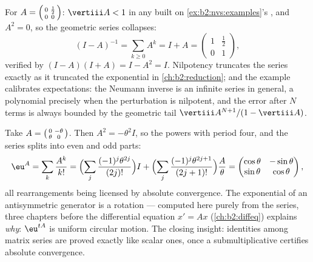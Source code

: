 \begin{example}\label{ex:b2:nvs:neumannfinite}
For $A = \begin{psmallmatrix}0 & \frac12\\ 0 &
0\end{psmallmatrix}$: $\vertiii A < 1$ in any 
built on \cref{ex:b2:nvs:examples}'s , and $A^2 = 0$, so
the geometric series collapses:
\[
(I - A)^{-1} = \sum_{k \geq 0} A^k = I + A =
\begin{pmatrix}1 & \tfrac12\\ 0 & 1\end{pmatrix},
\]
verified by $(I - A)(I + A) = I - A^2 = I$. Nilpotency
truncates the series exactly as it truncated the exponential in
\cref{ch:b2:reduction}; and the example calibrates
expectations: the Neumann inverse is an infinite series in
general, a polynomial precisely when the perturbation is
nilpotent, and the error after $N$ terms is always bounded by
the geometric tail $\vertiii A^{N+1}/(1 - \vertiii A)$.
\end{example}

\begin{example}\label{ex:b2:nvs:rotationexp}
Take $A = \begin{psmallmatrix}0 & -\theta\\ \theta &
0\end{psmallmatrix}$. Then $A^2 = -\theta^2 I$, so the powers
 with period four, and the series splits into even and odd
parts:
\[
\eu^{A} = \sum_{k}\frac{A^k}{k!}
= \Bigl(\sum_{j}\frac{(-1)^j\theta^{2j}}{(2j)!}\Bigr) I
+ \Bigl(\sum_{j}\frac{(-1)^j\theta^{2j+1}}{(2j+1)!}\Bigr)
\frac{A}{\theta}
= \begin{pmatrix}
\cos\theta & -\sin\theta\\
\sin\theta & \cos\theta
\end{pmatrix},
\]
all rearrangements being licensed by absolute convergence. The
exponential of an antisymmetric generator is a rotation ---
computed here purely from the series, three chapters before the
differential equation $x' = Ax$ (\cref{ch:b2:diffeq}) explains
\emph{why}: $\eu^{tA}$ is uniform circular motion. The closing
insight: identities among matrix series are proved exactly like
scalar ones, once a submultiplicative  certifies absolute
convergence.
\end{example}

